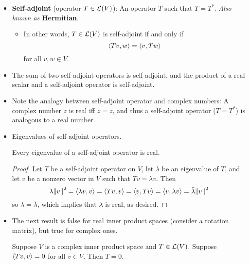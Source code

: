 \documentclass[../main.tex]{subfiles}
\begin{document}
\begin{itemize}
\begin{theorem}
\begin{proof}
\begin{align*}
                &= \overline{\inp{Te_j}{f_k}}
            \end{align*}
            Therefore, the entry in row $k$ column $j$ of $\mat{T^*}$ is the complex conjugate of the entry in row $j$ column $k$ of $\mat{T}$, as desired.
        \end{proof}
    \end{theorem}
    \item \textbf{Self-adjoint} (operator $T\in\mathcal{L}(V)$): An operator $T$ such that $T=T^*$. \emph{Also known as} \textbf{Hermitian}.
    \begin{itemize}
        \item In other words, $T\in\mathcal{L}(V)$ is self-adjoint if and only if
        \begin{equation*}
            \left\langle{Tv},{w}\right\rangle = \left\langle{v},{Tw}\right\rangle
        \end{equation*}
        for all $v,w\in V$.
    \end{itemize}
    \item The sum of two self-adjoint operators is self-adjoint, and the product of a real scalar and a self-adjoint operator is self-adjoint.
    \item Note the analogy between self-adjoint operator and complex numbers: A complex number $z$ is real iff $z=\bar{z}$, and thus a self-adjoint operator ($T=T^*$) is analogous to a real number.
    \item Eigenvalues of self-adjoint operators.
    \begin{theorem}
        Every eigenvalue of a self-adjoint operator is real.
        \begin{proof}
            Let $T$ be a self-adjoint operator on $V$, let $\lambda$ be an eigenvalue of $T$, and let $v$ be a nonzero vector in $V$ such that $Tv=\lambda v$. Then
            \begin{equation*}
                \lambda\norm{v}^2 = \left\langle{\lambda v},{v}\right\rangle = \left\langle{Tv},{v}\right\rangle = \left\langle{v},{Tv}\right\rangle = \left\langle{v},{\lambda v}\right\rangle = \bar{\lambda}\norm{v}^2
            \end{equation*}
            so $\lambda=\bar{\lambda}$, which implies that $\lambda$ is real, as desired.
        \end{proof}
    \end{theorem}
    \item The next result is false for real inner product spaces (consider a rotation matrix), but true for complex ones.
    \begin{theorem}\label{trm:inpTvvZero}
        Suppose $V$ is a complex inner product space and $T\in\mathcal{L}(V)$. Suppose $\left\langle{Tv},{v}\right\rangle=0$ for all $v\in V$. Then $T=0$.

\end{theorem}
\end{itemize}
\end{document}
